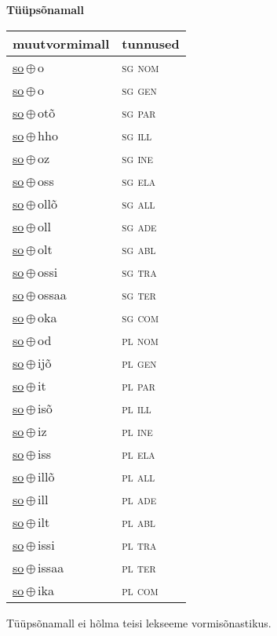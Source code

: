 

\vspace{3.5em}
\noindent \begin{minipage}{\textwidth}
\noindent \textbf{Tüüpsõnamall \,}\\

\begin{sideways}
\begin{tabular}{l l}
muutvormimall & tunnused \\
\hline
\underline{so}\,$\oplus$\,o & \textsc{ sg nom } \\
\underline{so}\,$\oplus$\,o & \textsc{ sg gen } \\
\underline{so}\,$\oplus$\,otõ & \textsc{ sg par } \\
\underline{so}\,$\oplus$\,hho & \textsc{ sg ill } \\
\underline{so}\,$\oplus$\,oz & \textsc{ sg ine } \\
\underline{so}\,$\oplus$\,oss & \textsc{ sg ela } \\
\underline{so}\,$\oplus$\,ollõ & \textsc{ sg all } \\
\underline{so}\,$\oplus$\,oll & \textsc{ sg ade } \\
\underline{so}\,$\oplus$\,olt & \textsc{ sg abl } \\
\underline{so}\,$\oplus$\,ossi & \textsc{ sg tra } \\
\underline{so}\,$\oplus$\,ossaa & \textsc{ sg ter } \\
\underline{so}\,$\oplus$\,oka & \textsc{ sg com } \\
\underline{so}\,$\oplus$\,od & \textsc{ pl nom } \\
\underline{so}\,$\oplus$\,ijõ & \textsc{ pl gen } \\
\underline{so}\,$\oplus$\,it & \textsc{ pl par } \\
\underline{so}\,$\oplus$\,isõ & \textsc{ pl ill } \\
\underline{so}\,$\oplus$\,iz & \textsc{ pl ine } \\
\underline{so}\,$\oplus$\,iss & \textsc{ pl ela } \\
\underline{so}\,$\oplus$\,illõ & \textsc{ pl all } \\
\underline{so}\,$\oplus$\,ill & \textsc{ pl ade } \\
\underline{so}\,$\oplus$\,ilt & \textsc{ pl abl } \\
\underline{so}\,$\oplus$\,issi & \textsc{ pl tra } \\
\underline{so}\,$\oplus$\,issaa & \textsc{ pl ter } \\
\underline{so}\,$\oplus$\,ika & \textsc{ pl com } \\
\end{tabular}
\end{sideways}
\label{tab:tüüpsõnamall-soo}

\end{minipage}

 
\vspace{1em}
\noindent Tüüpsõnamall  ei hõlma teisi lekseeme vormi\-sõnastikus.
